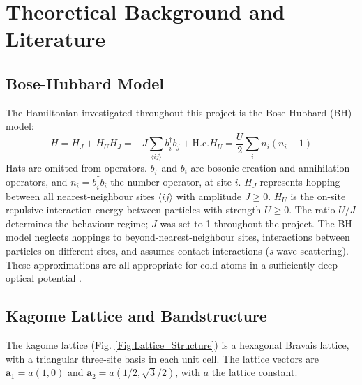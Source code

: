 \chapter{Theoretical Background and Literature}\label{Sec:Theory_and_Literature}

\section{Bose-Hubbard Model}\label{Sec:BHM_Theory}
The Hamiltonian investigated throughout this project is the Bose-Hubbard (BH) model:
\begin{subequations}\label{Eq:BHM}
\begin{equation}
    H = H_J + H_U
\end{equation}
\begin{equation}\label{Eq:HoppingHamiltonian}
    H_J = -J\sum_{\langle ij \rangle}b_{i}^{\dag}b_{j} + \text{H.c.}
\end{equation}
\begin{equation}\label{Eq:InteractionHamiltonian}
    H_U = \frac{U}{2}\sum_{i}n_{i}(n_{i}-1)
\end{equation}
\end{subequations}
Hats are omitted from operators. $b_{i}^\dag$ and $b_{i}$ are bosonic creation and annihilation operators, and $n_i=b_{i}^{\dag}b_{i}$ the number operator, at site $i$. $H_J$ represents hopping between all nearest-neighbour sites $\langle ij \rangle$ with amplitude $J\geq0$. $H_U$ is the on-site repulsive interaction energy between particles with strength $U\geq0$. The ratio $U/J$ determines the behaviour regime; $J$ was set to 1 throughout the project. The BH model neglects hoppings to beyond-nearest-neighbour sites, interactions between particles on different sites, and assumes contact interactions (\textit{s}-wave scattering). These approximations are all appropriate for cold atoms in a sufficiently deep optical potential \cite{Jaksch}.

\section{Kagome Lattice and Bandstructure}\label{Sec:Kagome_FB_Theory}

The kagome lattice (Fig. \ref{Fig:Lattice_Structure}) is a hexagonal Bravais lattice, with a triangular three-site basis in each unit cell. The lattice vectors are $\textbf{a}_1=a(1,0)$ and $\textbf{a}_2=a(1/2,\sqrt{3}/2)$, with $a$ the lattice constant.

